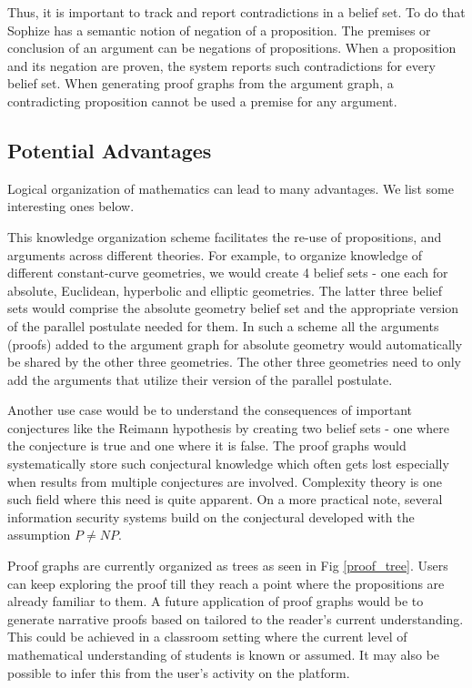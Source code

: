 \documentclass[runningheads]{llncs}
\begin{document}
Thus, it is important to track and report contradictions in a belief set. To do that Sophize has a semantic notion of negation of a proposition. The premises or conclusion of an argument can be negations of propositions. When a proposition and its negation are proven, the system reports such contradictions for every belief set. When generating proof graphs from the argument graph, a contradicting proposition cannot be used a premise for any argument.

\subsection{Potential Advantages}

Logical organization of mathematics can lead to many advantages. We list some interesting ones below.

This knowledge organization scheme facilitates the re-use of propositions, and arguments across different theories. For example, to organize knowledge of different constant-curve geometries, we would create 4 belief sets - one each for absolute, Euclidean, hyperbolic and elliptic geometries. The latter three belief sets would comprise the absolute geometry belief set and the appropriate version of the parallel postulate needed for them. In such a scheme all the arguments (proofs) added to the argument graph for absolute geometry would automatically be shared by the other three geometries. The other three geometries need to only add the arguments that utilize their version of the parallel postulate.

Another use case would be to understand the consequences of important conjectures like the Reimann hypothesis by creating two belief sets - one where the conjecture is true and one where it is false. The proof graphs would systematically store such conjectural knowledge which often gets lost especially when results from multiple conjectures are involved. Complexity theory is one such field where this need is quite apparent. On a more practical note, several information security systems build on the conjectural developed with the assumption $P \neq NP$.

Proof graphs are currently organized as trees as seen in Fig \ref{proof_tree}. Users can keep exploring the proof till they reach a point where the propositions are already familiar to them. A future application of proof graphs would be to generate narrative proofs based on tailored to the reader's current understanding. This could be achieved in a classroom setting where the current level of mathematical understanding of students is known or assumed. It may also be possible to infer this from the user's activity on the platform.
\end{document}

